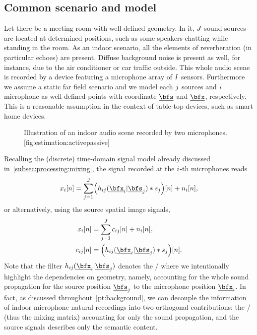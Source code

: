 \subsection{Common scenario and model}
Let there be a meeting room with well-defined geometry.
In it, $J$ sound sources are located at determined positions, such as some speakers chatting while standing in the room.
As an indoor scenario, all the elements of reverberation (in particular echoes) are present.
Diffuse background noise is present as well, for instance, due to the air conditioner or car traffic outside.
This whole audio scene is recorded by a device featuring a microphone array of $I$ sensors.
Furthermore we assume a static far field scenario and we model each $j$ sources and $i$ microphone as well-defined points with coordinate $\positionSource$ and $\positionMicrophone$, respectively.
This is a reasonable assumption in the context of table-top devices, such as smart home devices.
\begin{figure}[]
    \begin{sidecaption}{%
        Illustration of an indoor audio scene recorded by two microphones.
    }[fig:estimation:activepassive]
    \centering
    \resizebox{\linewidth}{!}{}
    \end{sidecaption}
\end{figure}
Recalling the (discrete) time-domain signal model already discussed in~\cref{subsec:processing:mixing}, the signal recorded at the $i$-th microphones reads
\begin{equation}
    \label{eq:application:mix}
    \mic_\idxMic[n] = \sum_{\idxSrc = 1}^{\numSrcs}
        \kparen{\flt_{\idxMicSrc}( \positionMicrophone_{\idxMic}  | \positionSource_{\idxSrc}) \convDis \src_{\idxSrc}} [n] + \nse_\idxMic[n]
    ,
\end{equation}
or alternatively, using the source spatial image signals,
\begin{equation}
    \label{eq:application:mix_img}
    \begin{aligned}
        \mic_\idxMic[n]     &= \sum_{\idxSrc = 1}^{\numSrcs} \img_{\idxMicSrc}[n] + \nse_\idxMic[n],\\
        \img_{\idxMicSrc}[n]  &= \kparen{\flt_{\idxMicSrc}( \positionMicrophone_{\idxMic}  | \positionSource_{\idxSrc}) \convDis \src_{\idxSrc}}[n]
        .
    \end{aligned}
\end{equation}
Note that the filter $\flt_{\idxMicSrc}(\positionMicrophone_{\idxMic} | \positionSource_{\idxSrc})$ denotes the \RIR/ where we intentionally highlight the dependencies on geometry,
namely, accounting for the whole sound propagation for the source position $\positionSource_{\idxSrc}$ to the microphone position $\positionMicrophone_{\idxMic}$.
In fact, as discussed throughout~\cref{pt:background}, we can decouple the information of indoor microphone natural recordings into two orthogonal contributions:
the \RIRs/ (thus the mixing matrix) accounting for only the sound propagation, and the source signals describes only the semantic content.

